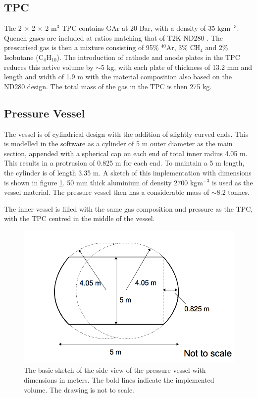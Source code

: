 \subsection{TPC}
 The 2 $\times$ 2 $\times$ 2 m$^{3}$ TPC contains GAr at 20 Bar, with a density of 35 kgm$^{-3}$. Quench gases are included at ratios matching that of T2K ND280 \cite{t2kNim}. The pressurised gas is then a mixture consisting of 95\% $^{40}$Ar, 3\% CH$_{4}$ and 2\% Isobutane (C$_{4}$H$_{10}$). The introduction of cathode and anode plates in the TPC reduces this active volume by $\sim$5 kg, with each plate of thickness of 13.2 mm and length and width of 1.9 m with the material composition also based on the ND280 design. The total mass of the gas in the TPC is then 275 kg. 

\subsection{Pressure Vessel}
The vessel is of cylindrical design with the addition of slightly curved ends. This is modelled in the software as a cylinder of 5 m outer diameter as the main section, appended with a spherical cap on each end of total inner radius 4.05 m. This results in a protrusion of 0.825 m for each end. To maintain a 5 m length, the cylinder is of length 3.35 m. A sketch of this implementation with dimensions is shown in figure \ref{fig:vesselSketch}. 50 mm thick aluminium of density 2700 kgm$^{-3}$ is used as the vessel material. The pressure vessel then has a considerable mass of $\sim$8.2 tonnes.

The inner vessel is filled with the same gas composition and pressure as the TPC, with the TPC centred in the middle of the vessel.

\begin{figure}[hbtp]
\begin{center}
  \includegraphics[width=120mm]{Chapter4/figures/vesselDrawing.png}
  \caption{The basic sketch of the side view of the pressure vessel with dimensions in meters. The bold lines indicate the implemented volume. The drawing is not to scale.}
  \label{fig:vesselSketch}
\end{center}
\end{figure}

